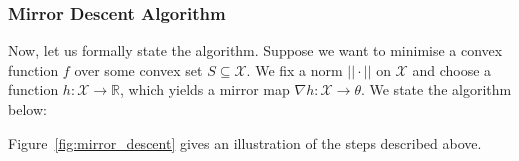 \subsubsection{Mirror Descent Algorithm}
Now, let us formally state the algorithm. Suppose we want to minimise a convex function $f$ over some convex set $S \subseteq \mathcal X$. We fix a norm $||\cdot ||$ on $\mathcal X$ and choose a function $h : \mathcal X \to \mathbb R$, which yields a mirror map $\nabla h : \mathcal X  \to \theta$. We state the algorithm below:

\begin{center}
\end{center}
Figure~\ref{fig:mirror_descent} gives an illustration of the steps described above.



